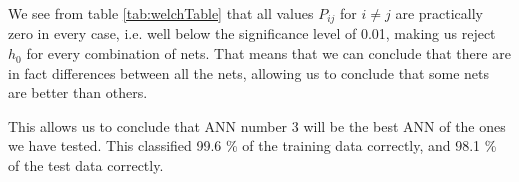 \documentclass[11pt,a4paper]{article}
\begin{document}
We see from table \ref{tab:welchTable} that all values $P_{ij}$ for $i \neq j$ are practically zero in every case, i.e. well below the significance level of 0.01, making us reject $h_0$ for every combination of nets. That means that we can conclude that there are in fact differences between all the nets, allowing us to conclude that some nets are better than others.

This allows us to conclude that ANN number 3 will be the best ANN of the ones we have tested. This classified 99.6 \% of the training data correctly, and 98.1 \% of the test data correctly.
\end{document}
